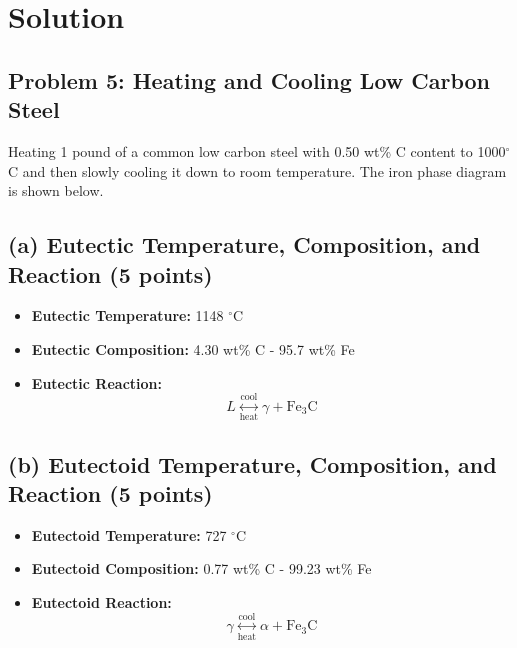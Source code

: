 \documentclass[12pt]{article}
\begin{document}
\section*{Solution}

\subsection*{Problem 5: Heating and Cooling Low Carbon Steel}
Heating 1 pound of a common low carbon steel with 0.50 wt\% C content to 1000\(^\circ\)C and then slowly cooling it down to room temperature. The iron phase diagram is shown below.

\subsection*{(a) Eutectic Temperature, Composition, and Reaction (5 points)}
\begin{itemize}
    \item \textbf{Eutectic Temperature:} 1148 \(^\circ\)C
    \item \textbf{Eutectic Composition:} 4.30 wt\% C - 95.7 wt\% Fe
    \item \textbf{Eutectic Reaction:}
    \begin{equation*}
        L \overset{\text{cool}}{\underset{\text{heat}}{\longleftrightarrow}} \gamma + \text{Fe}_3\text{C}
    \end{equation*}
\end{itemize}

\subsection*{(b) Eutectoid Temperature, Composition, and Reaction (5 points)}
\begin{itemize}
    \item \textbf{Eutectoid Temperature:} 727 \(^\circ\)C
    \item \textbf{Eutectoid Composition:} 0.77 wt\% C - 99.23 wt\% Fe
    \item \textbf{Eutectoid Reaction:}
    \begin{equation*}
        \gamma \overset{\text{cool}}{\underset{\text{heat}}{\longleftrightarrow}} \alpha + \text{Fe}_3\text{C}
    \end{equation*}
\end{itemize}
\end{document}
